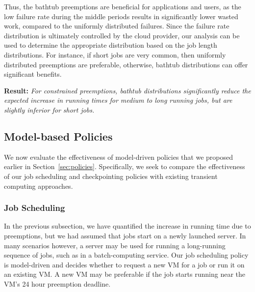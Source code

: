 Thus, the bathtub preemptions are beneficial for applications and users, as the low failure rate during the middle periods results in significantly lower wasted work, compared to the uniformly distributed failures.
Since the failure rate distribution is ultimately controlled by the cloud provider, our analysis can be used to determine the appropriate distribution based on the job length distributions.
For instance, if short jobs are very common, then uniformly distributed preemptions are preferable, otherwise, bathtub distributions can offer significant benefits. 

\noindent \textbf{Result:} \emph{For constrained preemptions, bathtub distributions significantly reduce the expected increase in running times for medium to long running jobs, but are slightly inferior for short jobs.}




\subsection{Model-based Policies}
\label{subsec:eval-policy}

We now evaluate the effectiveness of model-driven policies that we proposed earlier in Section~\ref{sec:policies}.
Specifically, we seek to compare the effectiveness of our job scheduling and checkpointing policies with existing transient computing approaches.



\subsubsection{Job Scheduling}

In the previous subsection, we have quantified the increase in running time due to preemptions, but we had assumed that jobs start on a newly launched server.
In many scenarios however, a server may be used for running a long-running sequence of jobs, such as in a batch-computing service. 
%
Our job scheduling policy is model-driven and decides whether to request a new VM for a job or run it on an existing VM.
A new VM may be preferable if the job starts running near the VM's 24 hour preemption deadline.

